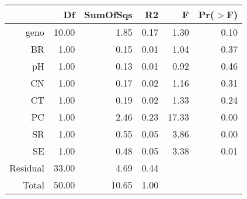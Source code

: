 \begin{table}[ht]
\centering
\begin{tabular}{rrrrrr}
  \hline
 & Df & SumOfSqs & R2 & F & Pr($>$F) \\ 
  \hline
geno & 10.00 & 1.85 & 0.17 & 1.30 & 0.10 \\ 
  BR & 1.00 & 0.15 & 0.01 & 1.04 & 0.37 \\ 
  pH & 1.00 & 0.13 & 0.01 & 0.92 & 0.46 \\ 
  CN & 1.00 & 0.17 & 0.02 & 1.16 & 0.31 \\ 
  CT & 1.00 & 0.19 & 0.02 & 1.33 & 0.24 \\ 
  PC & 1.00 & 2.46 & 0.23 & 17.33 & 0.00 \\ 
  SR & 1.00 & 0.55 & 0.05 & 3.86 & 0.00 \\ 
  SE & 1.00 & 0.48 & 0.05 & 3.38 & 0.01 \\ 
  Residual & 33.00 & 4.69 & 0.44 &  &  \\ 
  Total & 50.00 & 10.65 & 1.00 &  &  \\ 
   \hline
\end{tabular}
\end{table}
